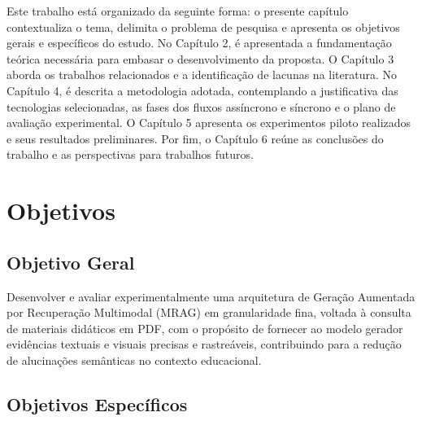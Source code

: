Este trabalho está organizado da seguinte forma: o presente capítulo contextualiza o tema, delimita o problema de pesquisa e apresenta os objetivos gerais e específicos do estudo. No Capítulo 2, é apresentada a fundamentação teórica necessária para embasar o desenvolvimento da proposta. O Capítulo 3 aborda os trabalhos relacionados e a identificação de lacunas na literatura. No Capítulo 4, é descrita a metodologia adotada, contemplando a justificativa das tecnologias selecionadas, as fases dos fluxos assíncrono e síncrono e o plano de avaliação experimental. O Capítulo 5 apresenta os experimentos piloto realizados e seus resultados preliminares. Por fim, o Capítulo 6 reúne as conclusões do trabalho e as perspectivas para trabalhos futuros.

\section{Objetivos}
\label{sec:objetivos}

\subsection{Objetivo Geral}
\label{subsec:objetivo_geral}

Desenvolver e avaliar experimentalmente uma arquitetura de Geração Aumentada por Recuperação Multimodal (MRAG) em granularidade fina, voltada à consulta de materiais didáticos em PDF, com o propósito de fornecer ao modelo gerador evidências textuais e visuais precisas e rastreáveis, contribuindo para a redução de alucinações semânticas no contexto educacional.

\subsection{Objetivos Específicos}
\label{subsec:objs_especificos}

